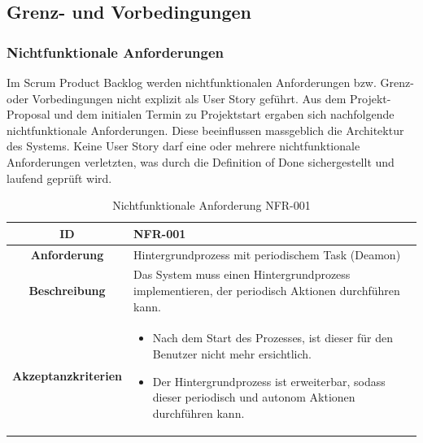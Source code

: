 \documentclass[a4paper,12pt]{report}
\begin{document}
    \newpage

    \subsection{Grenz- und Vorbedingungen}

    \subsubsection{Nichtfunktionale Anforderungen}\label{subsubsec:nichtfunktionale-anforderungen}
    Im Scrum Product Backlog werden nichtfunktionalen Anforderungen bzw.
    Grenz- oder Vorbedingungen nicht explizit als User Story geführt.
    Aus dem Projekt-Proposal und dem initialen Termin zu Projektstart ergaben sich nachfolgende nichtfunktionale Anforderungen.
    Diese beeinflussen massgeblich die Architektur des Systems.
    Keine User Story darf eine oder mehrere nichtfunktionale Anforderungen verletzten, was durch die Definition of Done sichergestellt und laufend geprüft wird.

    \begin{table}[h!]
        \centering
        \setlength{\leftmargini}{0.4cm}
        \begin{tabular}{|c|p{10cm}|}
            \hline
            \textbf{ID}           & NFR-001                                                                                            \\ \hline
            \textbf{Anforderung}  & Hintergrundprozess mit periodischem Task (Deamon)                                                  \\ \hline
            \textbf{Beschreibung} & Das System muss einen Hintergrundprozess implementieren, der periodisch Aktionen durchführen kann. \\ \hline
            \textbf{Akzeptanzkriterien} &
            \begin{itemize}
                \item Nach dem Start des Prozesses, ist dieser für den Benutzer nicht mehr ersichtlich.
                \item Der Hintergrundprozess ist erweiterbar, sodass dieser periodisch und autonom Aktionen durchführen kann.
            \end{itemize}
            \\ \hline
        \end{tabular}
        \caption{Nichtfunktionale Anforderung NFR-001}\label{tab:nfr-1}
    \end{table}
\end{document}
